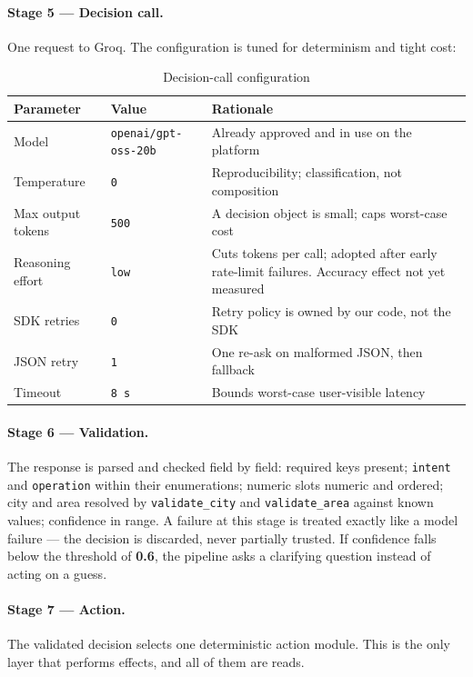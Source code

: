 \documentclass[11pt,a4paper]{article}
\newcommand{\fn}[1]{\texttt{\small #1}}
\begin{document}
\paragraph{Stage 5 --- Decision call.} One request to Groq. The configuration is tuned for
determinism and tight cost:

\begin{table}[H]
\centering
\caption{Decision-call configuration}
\small
\begin{tabularx}{\textwidth}{@{}l l >{\raggedright\arraybackslash}X@{}}
\toprule
\textbf{Parameter} & \textbf{Value} & \textbf{Rationale}\\
\midrule
Model & \fn{openai/gpt-oss-20b} & Already approved and in use on the platform\\
Temperature & \fn{0} & Reproducibility; classification, not composition\\
Max output tokens & \fn{500} & A decision object is small; caps worst-case cost\\
Reasoning effort & \fn{low} & Cuts tokens per call; adopted after early rate-limit failures. Accuracy effect not yet measured\\
SDK retries & \fn{0} & Retry policy is owned by our code, not the SDK\\
JSON retry & \fn{1} & One re-ask on malformed JSON, then fallback\\
Timeout & \fn{8\,s} & Bounds worst-case user-visible latency\\
\bottomrule
\end{tabularx}
\end{table}

\paragraph{Stage 6 --- Validation.} The response is parsed and checked field by field:
required keys present; \fn{intent} and \fn{operation} within their enumerations; numeric slots
numeric and ordered; city and area resolved by \fn{validate\_city} and \fn{validate\_area}
against known values; confidence in range. A failure at this stage is treated exactly like a
model failure --- the decision is discarded, never partially trusted. If confidence falls
below the threshold of \textbf{0.6}, the pipeline asks a clarifying question instead of acting
on a guess.

\paragraph{Stage 7 --- Action.} The validated decision selects one deterministic action
module. This is the only layer that performs effects, and all of them are reads.
\end{document}

